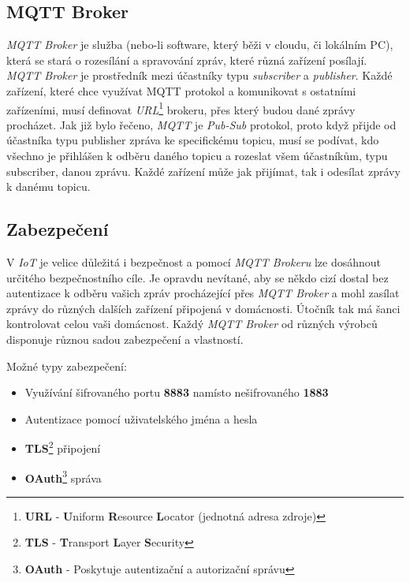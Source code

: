 \subsection*{MQTT Broker}
\emph{MQTT Broker} je služba (nebo-li software, který běži v cloudu, či lokálním PC), která se stará o rozesílání a spravování zpráv, které různá zařízení posílají.
\emph{MQTT Broker} je prostředník mezi účastníky typu \emph{subscriber} a \emph{publisher}.
Každé zařízení, které chce využívat MQTT protokol a komunikovat s ostatními zařízeními, musí definovat \emph{URL}\footnote{\textbf{URL} - \textbf{U}niform \textbf{R}esource \textbf{L}ocator (jednotná adresa zdroje)} brokeru, přes který budou dané zprávy procházet.
Jak již bylo řečeno, \emph{MQTT} je \emph{Pub-Sub} protokol, proto když přijde od účastníka typu publisher zpráva ke specifickému topicu, musí se podívat, kdo všechno je přihlášen k odběru daného topicu a rozeslat všem účastníkům, typu subscriber, danou zprávu.
Každé zařízení může jak přijímat, tak i odesílat zprávy k danému topicu.~\cite{wiki:mqtt_broker}

\subsection*{Zabezpečení}
V \emph{IoT} je velice důležitá i bezpečnost a pomocí \emph{MQTT Brokeru} lze dosáhnout určitého bezpečnostního cíle. Je opravdu nevítané, aby se někdo cizí dostal bez autentizace k odběru vašich
zpráv procházející přes \emph{MQTT Broker} a mohl zasílat zprávy do různých dalších zařízení připojená v domácnosti.
Útočník tak má šanci kontrolovat celou vaši domácnost. Každý \emph{MQTT Broker} od různých výrobců disponuje různou sadou zabezpečení a vlastností.~\cite{wiki:mqtt_broker}
\newline

Možné typy zabezpečení:
\begin{itemize}
  \item Využívání šifrovaného portu \textbf{8883} namísto nešifrovaného \textbf{1883}
  \item Autentizace pomocí uživatelského jména a hesla
  \item \textbf{TLS}\footnote{\textbf{TLS} - \textbf{T}ransport \textbf{L}ayer \textbf{S}ecurity} připojení
  \item \textbf{OAuth}\footnote{\textbf{OAuth} - Poskytuje autentizační a autorizační správu} správa
\end{itemize}

\newpage
